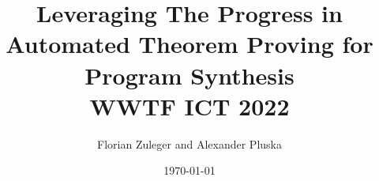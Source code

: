 \documentclass[a4paper,12pt]{article}
\begin{document}
\title{Leveraging The Progress in Automated Theorem Proving for Program Synthesis\\
\small{WWTF ICT 2022}}
\author{Florian Zuleger and Alexander Pluska}
\date{\today}
\maketitle

\begin{abstract}


\end{abstract}
\end{document}
